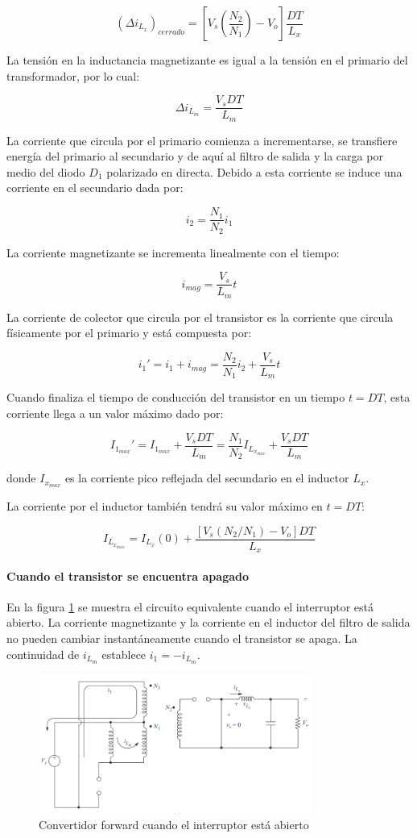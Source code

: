$$ (\Delta i_{L_x})_{cerrado}=\left[V_s\left(\frac{N_2}{N_1}\right)-V_o\right]\frac{DT}{L_x} $$

La tensión en la inductancia magnetizante es igual a la tensión en el primario del transformador, por lo cual:

$$ \Delta i_{L_m}=\frac{V_sDT}{L_m} $$

La corriente que circula por el primario comienza a incrementarse,
se transfiere energía del primario al secundario y de aquí al filtro de salida y la carga por medio del diodo $D_1$ polarizado en directa. 
Debido a esta corriente se induce una corriente en el secundario dada por:

$$ i_2=\frac{N_1}{N_2}i_{1} $$

La corriente magnetizante se incrementa linealmente con el tiempo:

$$ i_{mag}=\frac{V_s}{L_m}t $$

La corriente de colector que circula por el transistor es la corriente 
que circula físicamente por el primario y está compuesta por:

$$ i_1'=i_1+i_{mag}=\frac{N_2}{N_1}i_{2}+\frac{V_s}{L_m}t $$

Cuando finaliza el tiempo de conducción del transistor en un tiempo $t=DT$, esta corriente llega a un valor máximo dado por:

$$ I_{1_{max}}'=I_{1_{max}}+\frac{V_sDT}{L_m}=\frac{N_1}{N_2}I_{L_{x_{max}}} +\frac{V_sDT}{L_m} $$

donde $I_{x_{max}}$ es la corriente pico reflejada del secundario en el inductor $L_x$.

La corriente por el inductor también tendrá su valor máximo en $t=DT$:

$$ I_{L_{x_{max}}}=I_{L_x}(0)+\frac{\left[V_s(N_2/N_1)-V_o\right]DT}{L_x} $$

\paragraph{Cuando el transistor se encuentra apagado}
En la figura \ref{fig:forward_switch_open} se muestra el circuito equivalente cuando el interruptor está abierto.  
La corriente magnetizante y la corriente en el inductor del filtro de salida no pueden cambiar instantáneamente cuando el transistor se apaga. 
La continuidad de $i_{L_m}$ establece $ i_1=-i_{L_m} $.

\begin{figure}[ht]
    \centering
    \includegraphics[width=0.8\textwidth]{images/hart/forward_switch_open.png}
    \caption{Convertidor forward cuando el interruptor está abierto}
    \label{fig:forward_switch_open}
\end{figure}

